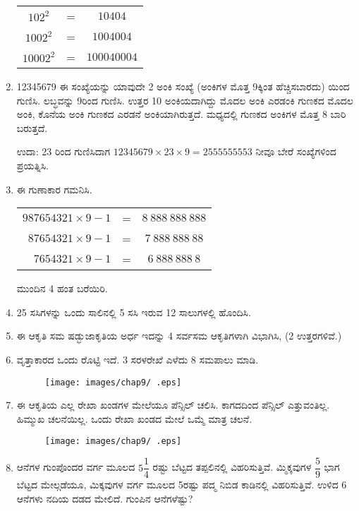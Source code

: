 \begin{enumerate}
\begin{tabular}[t]{ccc}
$102^{2}$ & = & $10404$\\
$1002^{2}$ & = & $1004004$\\
$10002^{2}$ & = & $100040004$\\
\end{tabular}

\item 12345679 ಈ ಸಂಖ್ಯೆಯನ್ನು ಯಾವುದೇ 2 ಅಂಕಿ ಸಂಖ್ಯೆ (ಅಂಕಿಗಳ ಮೊತ್ತ 9ಕ್ಕಿಂತ ಹೆಚ್ಚಿಸಬಾರದು) ಯಿಂದ ಗುಣಿಸಿ. ಲಬ್ಧವನ್ನು 9ರಿಂದ ಗುಣಿಸಿ. ಉತ್ತರ 10 ಅಂಕಿಯದಾಗಿದ್ದು ಮೊದಲ ಅಂಕಿ ಎರಡಂಕಿ ಗುಣಕದ ಮೊದಲ ಅಂಕಿ, ಕೊನೆಯ ಅಂಕಿ ಗುಣಕದ ಎರಡನೆ ಅಂಕಿಯಾಗಿರುತ್ತದೆ. ಮಧ್ಯದಲ್ಲಿ ಗುಣಕದ ಅಂಕಿಗಳ ಮೊತ್ತ 8 ಬಾರಿ ಬರುತ್ತದೆ. 

ಉದಾ: 23 ರಿಂದ ಗುಣಿಸಿದಾಗ $12345679\times 23\times 9 = 2555555553$ ನೀವೂ ಬೇರೆ ಸಂಖ್ಯೆಗಳಿಂದ ಪ್ರಯತ್ನಿಸಿ. 

\item ಈ ಗುಣಾಕಾರ ಗಮನಿಸಿ. 

\begin{tabular}[t]{rcc}
$987654321\times 9 - 1$ & = &  $8~888~888~888$\\
$87654321\times 9 - 1$ & = &  $7~888~888~88$\\
$7654321\times 9 - 1$ & = &  $6~888~888~8$
\end{tabular}

ಮುಂದಿನ 4 ಹಂತ ಬರೆಯಿರಿ. 

\item 25 ಸಸಿಗಳನ್ನು ಒಂದು ಸಾಲಿನಲ್ಲಿ 5 ಸಸಿ ಇರುವ 12 ಸಾಲುಗಳಲ್ಲಿ ಹೊಂದಿಸಿ. 

\item ಈ ಆಕೃತಿ ಸಮ ಷಡ್ಭುಜಾಕೃತಿಯ ಅರ್ಧ ಇದನ್ನು 4 ಸರ್ವಸಮ ಆಕೃತಿಗಳಾಗಿ ವಿಭಾಗಿಸಿ, (2 ಉತ್ತರಗಳಿವೆ.)

\item ವೃತ್ತಾಕಾರದ ಒಂದು ರೊಟ್ಟಿ ಇದೆ. 3 ಸರಳರೇಖೆ ಎಳೆದು 8 ಸಮಪಾಲು ಮಾಡಿ. 
\begin{figure}[!h]
\centering
\texttt{[image: images/chap9/ .eps]}
\end{figure}

\item ಈ ಆಕೃತಿಯ ಎಲ್ಲ ರೇಖಾ ಖಂಡಗಳ ಮೇಲೆಯೂ ಪೆನ್ಸಿಲ್ ಚಲಿಸಿ. ಕಾಗದದಿಂದ ಪೆನ್ಸಿಲ್ ಎತ್ತುವಂತಿಲ್ಲ. ಹಿಮ್ಮುಖ ಚಲನೆಯಿಲ್ಲ. ಒಂದು ರೇಖಾ ಖಂಡದ ಮೇಲೆ ಒಮ್ಮೆ ಮಾತ್ರ ಚಲನೆ. 
\begin{figure}[!h]
\centering
\texttt{[image: images/chap9/ .eps]}
\end{figure}

\item ಆನೆಗಳ ಗುಂಪೊಂದರ ವರ್ಗ ಮೂಲದ $5\dfrac{1}{4}$ ರಷ್ಟು ಬೆಟ್ಟದ ತಪ್ಪಲಿನಲ್ಲಿ ವಿಹರಿಸುತ್ತಿವೆ. ಮ್ಮಿಕ್ಕವುಗಳ $\dfrac{5}{9}$ ಭಾಗ ಬೆಟ್ಟದ ಮೇಲ್ಗಡೆಯೂ, ಮಿಕ್ಕವುಗಳ ವರ್ಗ ಮೂಲದ 5ರಷ್ಟು ಪದ್ಮ ನಿಬಿಡ ಕಾಡಿನಲ್ಲಿ ವಿಹರಿಸುತ್ತಿವೆ. ಉಳಿದ 6 ಆನೆಗಳು ನದಿಯ ದಡದ ಮೇಲಿದೆ. ಗುಂಪಿನ ಆನೆಗಳೆಷ್ಟು? 


\end{enumerate}

